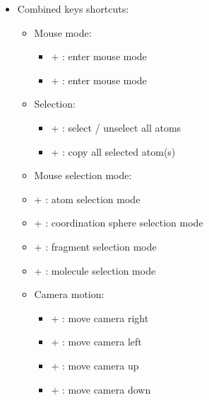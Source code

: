 {\begin{itemize}
\begin{itemize}
\begin{itemize}
\item[] \DArrow : rotate down 
\end{itemize}
\item Misc:
\begin{itemize}
\item[] \Esc : exit fullscreen mode
\item[] \Spacebar : pause / restart spinning
\end{itemize}
\end{itemize}
\newpage
\item Combined keys shortcuts:
\begin{itemize}
\item Mouse mode:
\begin{itemize}
\item[] \Alt +  : enter mouse  mode
\item[] \Alt +  : enter mouse  mode 
\end{itemize}
\item Selection:
\begin{itemize}
\item[] \Ctrl +  : select / unselect all atoms
\item[] \Ctrl +  : copy all selected atom(s)
\end{itemize}
\item Mouse selection mode:
\item[] \Shift + : atom selection mode
\item[] \Shift + : coordination sphere selection mode
\item[] \Shift + : fragment selection mode
\item[] \Shift + : molecule selection mode 
\item Camera motion:
\begin{itemize}
\item[] \Ctrl + \RArrow : move camera right
\item[] \Ctrl + \LArrow : move camera left
\item[] \Ctrl + \UArrow : move camera up
\item[] \Ctrl + \DArrow : move camera down

\end{itemize}
\end{itemize}
\end{itemize}}
